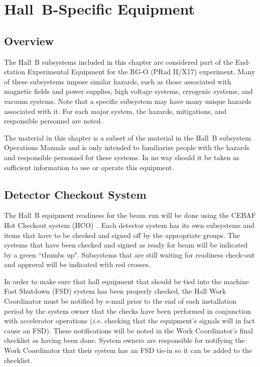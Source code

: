 \documentclass[12pt]{report}
\begin{document}
\chapter{Hall~B-Specific Equipment}

\section{Overview}

The Hall~B subsystems included in this chapter are considered part of the End-station 
Experimental Equipment for the RG-O (PRad II/X17) experiment. Many of these subsystems impose
similar hazards, such as those associated with magnetic fields and power supplies, high
voltage systems, cryogenic systems, and vacuum systems. Note that a specific subsystem may
have many unique hazards associated with it. For each major system, the hazards, mitigations, 
and responsible personnel are noted.

The material in this chapter is a subset of the material in the Hall~B subsystem Operations 
Manuals and is only intended to familiarize people with the hazards and responsible personnel 
for these systems. In no way should it be taken as sufficient information to use or operate 
this equipment.

\section{Detector Checkout System}

The Hall~B equipment readiness for the beam run will be done using the CEBAF Hot Checkout 
system (HCO)~\cite{hco}. Each detector system has its own subsystems and items that have 
to be checked and signed off by the appropriate groups. The systems that have been checked 
and signed as ready for beam will be indicated by a green ``thumbs up". Subsystems that are 
still waiting for readiness check-out and approval will be indicated with red crosses. 

In order to make sure that hall equipment that should be tied into the machine Fast Shutdown 
(FSD) system has been properly checked, the Hall Work Coordinator must be notified by e-mail 
prior to the end of each installation period by the system owner that the checks have been 
performed in conjunction with accelerator operations ({\it i.e.} checking that the equipment's 
signals will in fact cause an FSD). These notifications will be noted in the Work Coordinator's 
final checklist as having been done. System owners are responsible for notifying the Work 
Coordinator that their system has an FSD tie-in so it can be added to the checklist.
\end{document}
